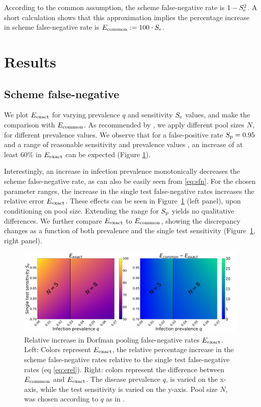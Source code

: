 \documentclass{article}
\begin{document}
According to the common assumption, the scheme false-negative rate is
$1-S_\text{e}^2$. A short calculation shows that this approximation implies
the percentage increase in scheme false-negative rate is $E_{\text{{common}}}
:= 100\cdot S_\text{e}$.

\section*{Results}\label{section:results}
\subsection*{Scheme false-negative}
We plot $E_{\text{{exact}}}$ for varying prevalence $q$ and sensitivity $S_\text{e}$
values, and make the comparison with $E_{\text{{common}}}$. As recommended by
\cite{DorfmanYuvalDor}, we apply different pool sizes $N$, for
different prevalence values. We observe that for a false-positive rate
$S_\text{p}=0.95$ \cite{DorfmanYuvalDor} and a range of reasonable
sensitivity and prevalence values \cite{KitComparison,
  InterpretingCOVID19Test, EstimatingRatesLourenco,
  FalsePositiveEstimate}, an increase of at least $60\%$ in
$E_{\text{{exact}}}$ can be expected (Figure \ref{fig1}).

Interestingly, an increase in infection prevalence monotonically
decreases the scheme false-negative rate, as can also be easily seen
from \eqref{eq:sfn}. For the chosen parameter ranges, the increase in
the single test false-negative rates increases the relative error
$E_{\text{{exact}}}$. These effects can be seen in Figure~\ref{fig1} (left
panel), upon conditioning on pool size. Extending the range for $S_\text{p}$
yields no qualitative differences. We further compare $E_{\text{{exact}}}$ to
$E_{\text{{common}}}$, showing the discrepancy changes as a function of both
prevalence and the single test sensitivity (Figure~\ref{fig1}, right
panel).
\begin{figure}[H]
  \centering
  \includegraphics[width=\textwidth]{heatmap_sfn.jpg}
  \caption{Relative increase in Dorfman pooling false-negative rates
    $E_{\text{{exact}}}$. Left: Colors represent $E_{\text{{exact}}}$, the relative
    percentage increase in the scheme false-negative rates relative
    to the single test false-negative rates (eq
    \eqref{eq:erel}). Right: colors represent the difference between
    $E_{\text{{common}}}$ and $E_{\text{{exact}}}$. The disease prevalence $q$, is
    varied on the x-axis, while the test sensitivity is varied on
    the y-axis. Pool size $N$, was chosen according to $q$ as in
    \cite{DorfmanYuvalDor}.}\label{fig1}
\end{figure}
\end{document}
